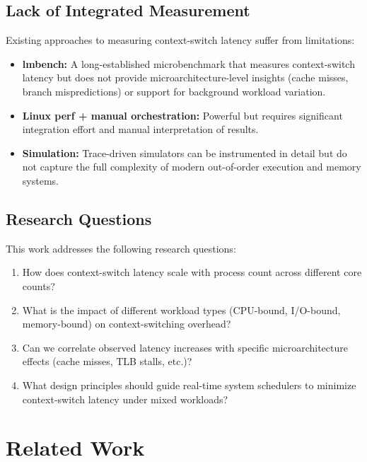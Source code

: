\documentclass[conference]{IEEEtran}
\begin{document}
\subsection{Lack of Integrated Measurement}

Existing approaches to measuring context-switch latency suffer from
limitations:

\begin{itemize}
  \item \textbf{lmbench:} A long-established microbenchmark that measures
        context-switch latency but does not provide microarchitecture-level
        insights (cache misses, branch mispredictions) or support for
        background workload variation.
  \item \textbf{Linux perf + manual orchestration:} Powerful but requires
        significant integration effort and manual interpretation of results.
  \item \textbf{Simulation:} Trace-driven simulators can be instrumented in
        detail but do not capture the full complexity of modern out-of-order
        execution and memory systems.
\end{itemize}

\subsection{Research Questions}

This work addresses the following research questions:

\begin{enumerate}
  \item How does context-switch latency scale with process count across
        different core counts?
  \item What is the impact of different workload types (CPU-bound, I/O-bound,
        memory-bound) on context-switching overhead?
  \item Can we correlate observed latency increases with specific
        microarchitecture effects (cache misses, TLB stalls, etc.)?
  \item What design principles should guide real-time system schedulers to
        minimize context-switch latency under mixed workloads?
\end{enumerate}

\section{Related Work}
\label{sec:related}
\end{document}
